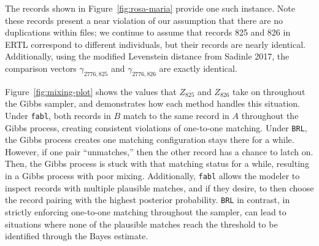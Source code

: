 \documentclass[12pt,letterpaper]{article}
\newcommand{\1}[1]{\mathbb{I}\!\left[#1\right]} %
\begin{document}
The records shown in Figure~\ref{fig:rosa-maria} provide one such instance. Note these
records present a near violation of our assumption that there are no
duplications within files; we continue to assume that records 825 and
826 in ERTL correspond to different individuals, but their records are
nearly identical. Additionally, using the modified Levenstein distance
from Sadinle 2017, the comparison vectors \(\gamma_{2776, 825}\) and
\(\gamma_{2776, 826}\) are exactly identical.

Figure~\ref{fig:mixing-plot} shows the values that \(Z_{825}\) and \(Z_{826}\) take on
throughout the Gibbs sampler, and demonstrates how each method handles
this situation. Under \texttt{fabl}, both records in \(B\) match to the
same record in \(A\) throughout the Gibbs process, creating consistent
violations of one-to-one matching. Under \texttt{BRL}, the Gibbs process
creates one matching configuration stays there for a while. However, if
one pair ``unmatches,'' then the other record has a chance to latch on.
Then, the Gibbs process is stuck with that matching status for a while,
resulting in a Gibbs process with poor mixing. Additionally,
\texttt{fabl} allows the modeler to inspect records with multiple
plausible matches, and if they desire, to then choose the record pairing
with the highest posterior probability. \texttt{BRL} in contrast, in
strictly enforcing one-to-one matching throughout the sampler, can lead
to situations where none of the plausible matches reach the threshold to
be identified through the Bayes estimate.
\end{document}
